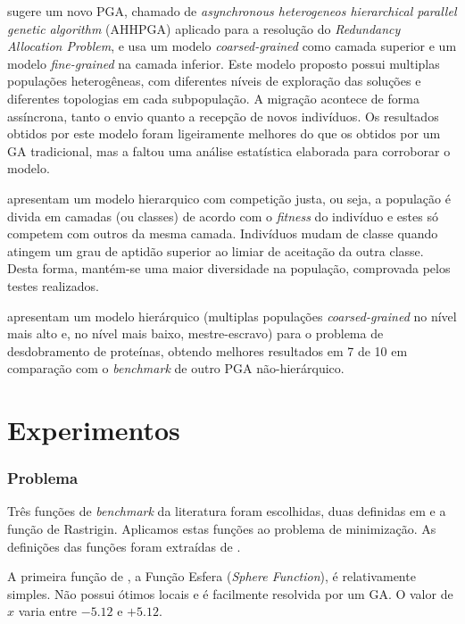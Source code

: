 \documentclass[12pt]{article}
\begin{document}
 \cite{zeng2007} sugere um novo PGA, chamado de \emph{asynchronous heterogeneos hierarchical parallel genetic algorithm} (AHHPGA) aplicado para a resolução do \emph{Redundancy Allocation Problem}, e usa um modelo \emph{coarsed-grained} como camada superior e um modelo \emph{fine-grained} na camada inferior. Este modelo proposto possui multiplas populações heterogêneas, com diferentes níveis de exploração das soluções e diferentes topologias em cada subpopulação. A migração acontece de forma assíncrona, tanto o envio quanto a recepção de novos indivíduos. Os resultados obtidos por este modelo foram ligeiramente melhores do que os obtidos por um GA tradicional, mas a faltou uma análise estatística elaborada para corroborar o modelo. 

\cite{heesung2009} apresentam um modelo hierarquico com competição justa, ou seja, a população é divida em camadas (ou classes) de acordo com o \emph{fitness} do indivíduo e estes só competem com outros da mesma camada. Indivíduos mudam de classe quando atingem um grau de aptidão superior ao limiar de aceitação da outra classe. Desta forma, mantém-se uma maior diversidade na população, comprovada pelos testes realizados.

 \cite{benitez2010} apresentam um modelo hierárquico (multiplas populações \emph{coarsed-grained} no nível mais alto e, no nível mais baixo, mestre-escravo) para o problema de desdobramento de proteínas, obtendo melhores resultados em 7 de 10 em comparação com o \emph{benchmark} de outro PGA não-hierárquico.


\section{Experimentos} %
\label{sec:experimentos}

\subsubsection{Problema} %
\label{ssub:problema}

Três funções de \emph{benchmark} da literatura foram escolhidas, duas definidas em \cite{dejong1975} e a função de Rastrigin. Aplicamos estas funções ao problema de minimização. As definições das funções foram extraídas de \cite{luke2005}.

A primeira função de \cite{dejong1975}, a Função Esfera (\emph{Sphere Function}), é relativamente simples. Não possui ótimos locais e é facilmente resolvida por um GA. O valor de $x$ varia entre $-5.12$ e $+5.12$.
\end{document}
